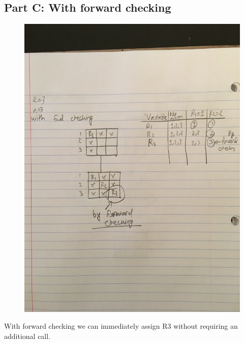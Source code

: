 \documentclass[paper=a4, fontsize=11pt]{scrartcl} %
\numberwithin{equation}{section} %
\numberwithin{figure}{section} %
\numberwithin{table}{section} %
\begin{document}
\subsection{Part C: With forward checking}
\begin{figure}[H]
    \includegraphics[width=\linewidth]{fwd.JPG}
\end{figure}

With forward checking we can immediately assign R3 without requiring an additional call.
\end{document}
